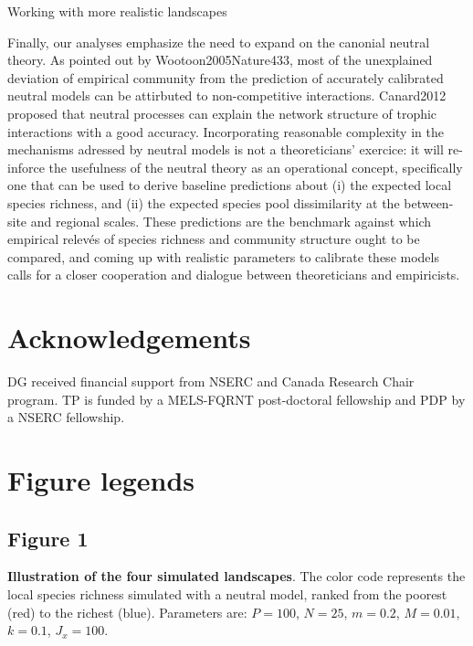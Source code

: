 \documentclass[12pt]{article}
\begin{document}
Working with more realistic landscapes

Finally, our analyses emphasize the need to expand on the canonial neutral
theory. As pointed out by Wootoon2005Nature433, most of the unexplained
deviation of empirical community from the prediction of accurately calibrated
neutral models can be attirbuted to non-competitive interactions. Canard2012
proposed that neutral processes can explain the network structure of trophic
interactions with a good accuracy. Incorporating reasonable complexity in the
mechanisms adressed by neutral models is not a theoreticians' exercice: it will
re-inforce the usefulness of the neutral theory as an operational concept,
specifically one that can be used to derive baseline predictions about (i) the
expected local species richness, and (ii) the expected species pool
dissimilarity at the between-site and regional scales. These predictions are the
benchmark against which empirical relev\'es of species richness and community
structure ought to be compared, and coming up with realistic parameters to
calibrate these models calls for a closer cooperation and dialogue between
theoreticians and empiricists.


\section{Acknowledgements}
DG received financial support from NSERC and Canada Research Chair program. TP
is funded by a MELS-FQRNT post-doctoral fellowship and PDP by a NSERC
fellowship.
\newpage

\printbibliography

\newpage
\section*{Figure legends}

\subsection*{Figure 1}
\textbf{Illustration of the four simulated landscapes}. The color code
represents the local species richness simulated with a neutral model, ranked
from the poorest (red) to the richest (blue). Parameters are: $P = 100$, $N =
25$, $m = 0.2$, $M = 0.01$, $k = 0.1$, $J_x = 100$.
\end{document}
